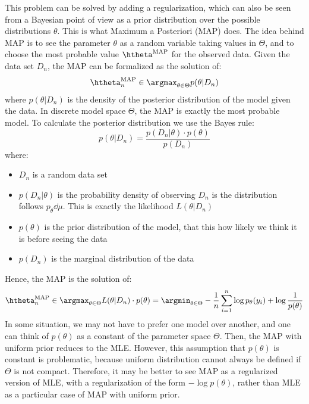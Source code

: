\documentclass[toc, titlepaged]{../cs-classes/cs-classes}
\begin{document}
This problem can be solved by adding a regularization, which can also be seen from a Bayesian point of view as a prior distribution over the possible distributions $\theta$. This is what Maximum a Posteriori (MAP) does. The idea behind MAP is to see the parameter $\theta$ as a random variable taking values in $\Theta$, and to choose the most probable value $\htheta^{\textnormal{MAP}}$ for the observed data. Given the data set $D_n$, the MAP can be formalized as the solution of:
\begin{equation*}
    \htheta_n^{\textnormal{MAP}}\in\argmax_{\theta\in\Theta}p(\theta|D_n)
\end{equation*}
where $p(\theta|D_n)$ is the density of the posterior distribution of the model given the data. In discrete model space $\Theta$, the MAP is exactly the most probable model. To calculate the posterior distribution we use the Bayes rule:
\begin{equation*}
    p(\theta|D_n) = \frac{p(D_n|\theta)\cdot p(\theta)}{p(D_n)}
\end{equation*}
where:
\begin{itemize}
    \item $D_n$ is a random data set
    \item $p(D_n|\theta)$ is the probability density of observing $D_n$ is the distribution follows $p_\theta\dd\mu$. This is exactly the likelihood $L(\theta|D_n)$
    \item $p(\theta)$ is the prior distribution of the model, that this how likely we think it is before seeing the data
    \item $p(D_n)$ is the marginal distribution of the data
\end{itemize}

Hence, the MAP is the solution of:
\begin{equation}
    \htheta_n^{\textnormal{MAP}} \in \argmax_{\theta\in\Theta} L(\theta|D_n)\cdot p(\theta) = \argmin_{\theta\in\Theta} -\frac{1}{n}\sum_{i=1}^n\log p_\theta(y_i) + \log\frac{1}{p(\theta)}
\end{equation}
In some situation, we may not have to prefer one model over another, and one can think of $p(\theta)$ as a constant of the parameter space $\Theta$. Then, the MAP with uniform prior reduces to the MLE. However, this assumption that $p(\theta)$ is constant is problematic, because uniform distribution cannot always be defined if $\Theta$ is not compact. Therefore, it may be better to see MAP as a regularized version of MLE, with a regularization of the form $-\log p(\theta)$, rather than MLE as a particular case of MAP with uniform prior.
\end{document}

